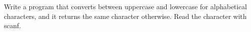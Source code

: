 Write a program that converts between uppercase and lowercase for alphabetical characters,
and it returns the same character otherwise.
Read the character with scanf.
